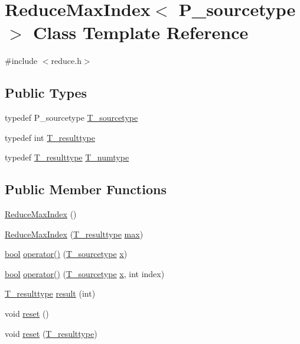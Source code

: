 \hypertarget{classReduceMaxIndex}{}\section{Reduce\+Max\+Index$<$ P\+\_\+sourcetype $>$ Class Template Reference}
\label{classReduceMaxIndex}


{\ttfamily \#include $<$reduce.\+h$>$}

\subsection*{Public Types}
\begin{DoxyCompactItemize}
\item 
typedef P\+\_\+sourcetype \hyperlink{classReduceMaxIndex_adfdd5e8fad286a64079e6ddcb46622e9}{T\+\_\+sourcetype}
\item 
typedef int \hyperlink{classReduceMaxIndex_a233790a71b058cce73f75ffe7523d1d9}{T\+\_\+resulttype}
\item 
typedef \hyperlink{classReduceMaxIndex_a233790a71b058cce73f75ffe7523d1d9}{T\+\_\+resulttype} \hyperlink{classReduceMaxIndex_a00d9bc74fd8688be2adfe00c25a7cabe}{T\+\_\+numtype}
\end{DoxyCompactItemize}
\subsection*{Public Member Functions}
\begin{DoxyCompactItemize}
\item 
\hyperlink{classReduceMaxIndex_aff4bed992518d9bbfa27c2b9382854ce}{Reduce\+Max\+Index} ()
\item 
\hyperlink{classReduceMaxIndex_a9126a82a059535a56834f3c779a77b0e}{Reduce\+Max\+Index} (\hyperlink{classReduceMaxIndex_a233790a71b058cce73f75ffe7523d1d9}{T\+\_\+resulttype} \hyperlink{vecbfn_8cc_a71f214d4a304fdc2089c54dbaf979fe5}{max})
\item 
\hyperlink{compiler_8h_abb452686968e48b67397da5f97445f5b}{bool} \hyperlink{classReduceMaxIndex_a8d6fa7433170429926c43efc2bb5a9cc}{operator()} (\hyperlink{classReduceMaxIndex_adfdd5e8fad286a64079e6ddcb46622e9}{T\+\_\+sourcetype} \hyperlink{vecnorm1_8cc_ac73eed9e41ec09d58f112f06c2d6cb63}{x})
\item 
\hyperlink{compiler_8h_abb452686968e48b67397da5f97445f5b}{bool} \hyperlink{classReduceMaxIndex_af0c1e00b96abfc582b62450d9ae7982c}{operator()} (\hyperlink{classReduceMaxIndex_adfdd5e8fad286a64079e6ddcb46622e9}{T\+\_\+sourcetype} \hyperlink{vecnorm1_8cc_ac73eed9e41ec09d58f112f06c2d6cb63}{x}, int index)
\item 
\hyperlink{classReduceMaxIndex_a233790a71b058cce73f75ffe7523d1d9}{T\+\_\+resulttype} \hyperlink{classReduceMaxIndex_aa15043eb72c29d985f2b07fa20587549}{result} (int)
\item 
void \hyperlink{classReduceMaxIndex_ad0800f0b1bf20e49eb3d43f11a9e9ba5}{reset} ()
\item 
void \hyperlink{classReduceMaxIndex_a7cdc9b325accd420efa6835d4c456764}{reset} (\hyperlink{classReduceMaxIndex_a233790a71b058cce73f75ffe7523d1d9}{T\+\_\+resulttype})
\end{DoxyCompactItemize}
